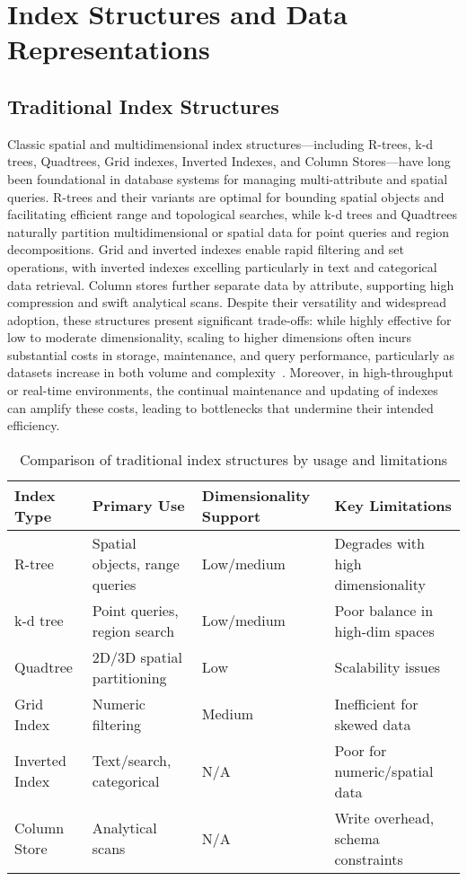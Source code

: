 \documentclass[sigconf]{acmart}
\begin{document}
\section{Index Structures and Data Representations}

\subsection{Traditional Index Structures}

Classic spatial and multidimensional index structures—including R-trees, k-d trees, Quadtrees, Grid indexes, Inverted Indexes, and Column Stores—have long been foundational in database systems for managing multi-attribute and spatial queries. R-trees and their variants are optimal for bounding spatial objects and facilitating efficient range and topological searches, while k-d trees and Quadtrees naturally partition multidimensional or spatial data for point queries and region decompositions. Grid and inverted indexes enable rapid filtering and set operations, with inverted indexes excelling particularly in text and categorical data retrieval. Column stores further separate data by attribute, supporting high compression and swift analytical scans. Despite their versatility and widespread adoption, these structures present significant trade-offs: while highly effective for low to moderate dimensionality, scaling to higher dimensions often incurs substantial costs in storage, maintenance, and query performance, particularly as datasets increase in both volume and complexity~\cite{ref111,ref112}. Moreover, in high-throughput or real-time environments, the continual maintenance and updating of indexes can amplify these costs, leading to bottlenecks that undermine their intended efficiency.

\begin{table*}[htbp]
\centering
\caption{Comparison of traditional index structures by usage and limitations}
\label{tab:traditional_indexes}
\begin{adjustbox}{max width=\textwidth}
\begin{tabular}{llll}
\toprule
\textbf{Index Type} & \textbf{Primary Use} & \textbf{Dimensionality Support} & \textbf{Key Limitations} \\
\midrule
R-tree & Spatial objects, range queries & Low/medium & Degrades with high dimensionality \\
k-d tree & Point queries, region search & Low/medium & Poor balance in high-dim spaces \\
Quadtree & 2D/3D spatial partitioning & Low & Scalability issues \\
Grid Index & Numeric filtering & Medium & Inefficient for skewed data \\
Inverted Index & Text/search, categorical & N/A & Poor for numeric/spatial data \\
Column Store & Analytical scans & N/A & Write overhead, schema constraints \\
\bottomrule
\end{tabular}
\end{adjustbox}
\end{table*}
\end{document}
